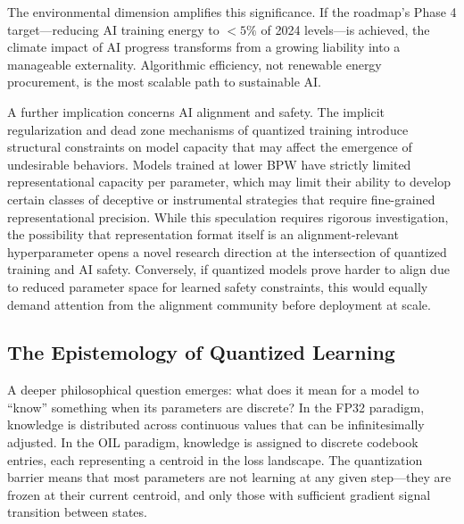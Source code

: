 The environmental dimension amplifies this significance. If the roadmap's Phase 4 target---reducing AI training energy to $< 5\%$ of 2024 levels---is achieved, the climate impact of AI progress transforms from a growing liability into a manageable externality. Algorithmic efficiency, not renewable energy procurement, is the most scalable path to sustainable AI.

A further implication concerns AI alignment and safety. The implicit regularization and dead zone mechanisms of quantized training introduce structural constraints on model capacity that may affect the emergence of undesirable behaviors. Models trained at lower BPW have strictly limited representational capacity per parameter, which may limit their ability to develop certain classes of deceptive or instrumental strategies that require fine-grained representational precision. While this speculation requires rigorous investigation, the possibility that representation format itself is an alignment-relevant hyperparameter opens a novel research direction at the intersection of quantized training and AI safety. Conversely, if quantized models prove harder to align due to reduced parameter space for learned safety constraints, this would equally demand attention from the alignment community before deployment at scale.

\subsection{The Epistemology of Quantized Learning}

A deeper philosophical question emerges: what does it mean for a model to ``know'' something when its parameters are discrete? In the FP32 paradigm, knowledge is distributed across continuous values that can be infinitesimally adjusted. In the OIL paradigm, knowledge is assigned to discrete codebook entries, each representing a centroid in the loss landscape. The quantization barrier means that most parameters are not learning at any given step---they are frozen at their current centroid, and only those with sufficient gradient signal transition between states.

